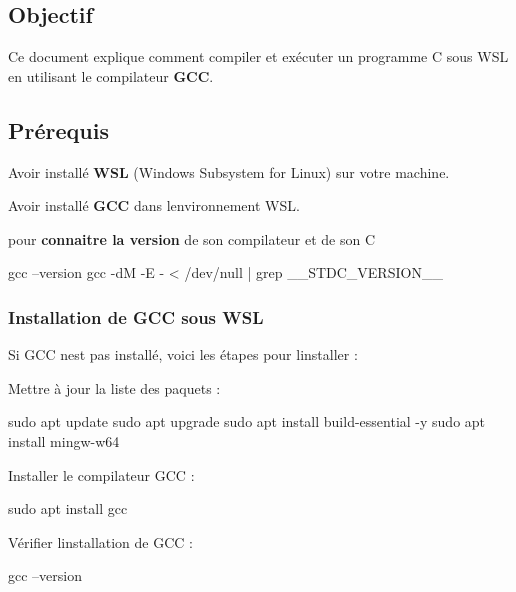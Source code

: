 \subsection*{Objectif}

Ce document explique comment compiler et exécuter un programme C sous W\+SL en utilisant le compilateur {\bfseries G\+CC}.

\subsection*{Prérequis}


\begin{DoxyItemize}
\item Avoir installé {\bfseries W\+SL} (Windows Subsystem for Linux) sur votre machine.
\item Avoir installé {\bfseries G\+CC} dans l\textquotesingle{}environnement W\+SL.
\item pour {\bfseries connaitre la version} de son compilateur et de son C
\end{DoxyItemize}


\begin{DoxyCode}
gcc --version
gcc -dM -E - < /dev/null | grep \_\_STDC\_VERSION\_\_
\end{DoxyCode}


\subsubsection*{Installation de G\+CC sous W\+SL}

Si G\+CC n\textquotesingle{}est pas installé, voici les étapes pour l\textquotesingle{}installer \+:


\begin{DoxyEnumerate}
\item Mettre à jour la liste des paquets \+:
\end{DoxyEnumerate}


\begin{DoxyCode}
sudo apt update
sudo apt upgrade
sudo apt install build-essential -y
sudo apt install mingw-w64
\end{DoxyCode}



\begin{DoxyEnumerate}
\item Installer le compilateur G\+CC \+: 
\begin{DoxyCode}
sudo apt install gcc
\end{DoxyCode}

\item Vérifier l\textquotesingle{}installation de G\+CC \+: 
\begin{DoxyCode}
gcc --version
\end{DoxyCode}

\end{DoxyEnumerate}

